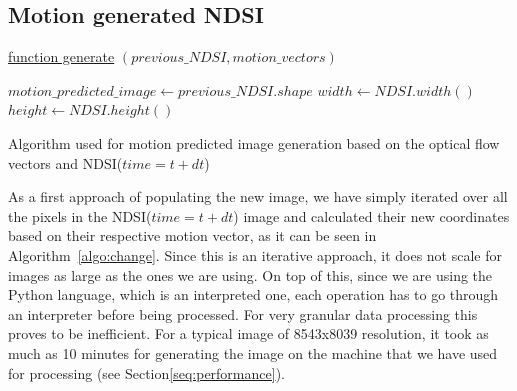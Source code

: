 \documentclass[12pt, a4paper]{report}
\begin{document}

	\subsection{Motion generated NDSI}
	\label{seq:motion_ndsi_implementation}
	
	\begin{algorithm}
			
			\underline{function generate} $(previous\_NDSI, motion\_vectors)$\;
			
			$motion\_predicted\_image \gets previous\_NDSI.shape$\;
			$width \gets NDSI.width()$\;
			$height \gets NDSI.height()$\;
			
			\;

			\caption{Algorithm used for motion predicted image generation based on the optical flow vectors and NDSI(\(time=t+dt\))}
			\label{algo:change}
	\end{algorithm}
	
	\par As a first approach of populating the new image, we have simply iterated over all
	the pixels in the NDSI(\(time=t+dt\)) image and calculated their new coordinates
	based on their respective motion vector, as it can be seen in Algorithm~\ref{algo:change}. Since this
	is an iterative approach, it does not scale for images as large as the ones we are using.
	On top of this, since we are using the Python language, which is an interpreted one,
	each operation has to go through an interpreter before being processed. For very granular data
	processing this proves to be inefficient. For a typical image of 8543x8039 resolution, it
	took as much as 10 minutes for generating the image on the machine that we have used for processing (see Section\ref{seq:performance}).
	
\end{document}
